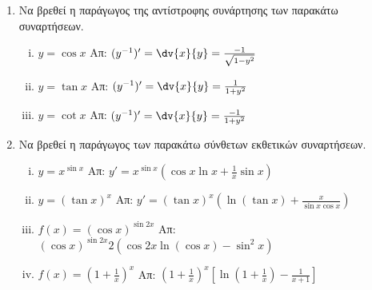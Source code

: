 \begin{enumerate}
\item Να βρεθεί η παράγωγος της αντίστροφης συνάρτησης των παρακάτω συναρτήσεων.

	\begin{enumerate}[i)]
		\item $ y = \cos{x} $ \hfill Απ: $ (y^{-1})' = \dv{x}{y} = \frac{-1}{\sqrt{1-y^{2}}} $
		\item $ y = \tan{x} $ \hfill Απ: $ (y^{-1})' = \dv{x}{y} = \frac{1}{1+y^{2}} $
		\item $ y = \cot{x} $ \hfill Απ: $ (y^{-1})' = \dv{x}{y} = \frac{-1}{1+y^{2}} $
	\end{enumerate}
	
\item Να βρεθεί η παράγωγος των παρακάτω σύνθετων εκθετικών συναρτήσεων.
	\begin{enumerate}[i)]
		\item $y = x^{\sin{x}} $ \hfill Απ: $ y' = x^{\sin{x}}\left(\cos{x} \ln{x} + \frac{1}{x} \sin{x} \right) $
		\item $ y= (\tan{x})^{x} $ \hfill Απ: $ y' = \left(\tan{x}\right)^{x} \left(\ln{(\tan{x})} +
			\frac{x}{\sin{x} \cos{x}}\right) $
					\item $ f(x) = (\cos{x})^{\sin{2x}} $ \hfill Απ: $
			(\cos{x})^{\sin{2x}} 2(\cos{2x} \ln{(\cos{x})} - \sin^{2}{x}) $
			\item $ f(x) = \left(1 + \frac{1}{x} \right)^{x} $ \hfill Απ: $
				\left(1 + \frac{1}{x}\right)^{x}\left[\ln{(1 + \frac{1}{x})} -
				\frac{1}{x+1}\right] $
	\end{enumerate}
\end{enumerate}

